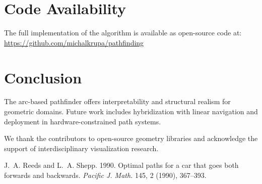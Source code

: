 \documentclass[sigconf]{acmart}
\begin{document}
\section{Code Availability}
The full implementation of the algorithm is available as open-source code at: \url{https://github.com/michalkrupa/pathfinding}

\section{Conclusion}
The arc-based pathfinder offers interpretability and structural realism for geometric domains. Future work includes hybridization with linear navigation and deployment in hardware-constrained path systems.

\begin{acks}
We thank the contributors to open-source geometry libraries and acknowledge the support of interdisciplinary visualization research.
\end{acks}


\begin{thebibliography}{1}

 J.~A. Reeds and L.~A. Shepp. 1990. Optimal paths for a car that goes both forwards and backwards. \emph{Pacific J. Math.} 145, 2 (1990), 367--393.
\end{thebibliography}
\end{document}
